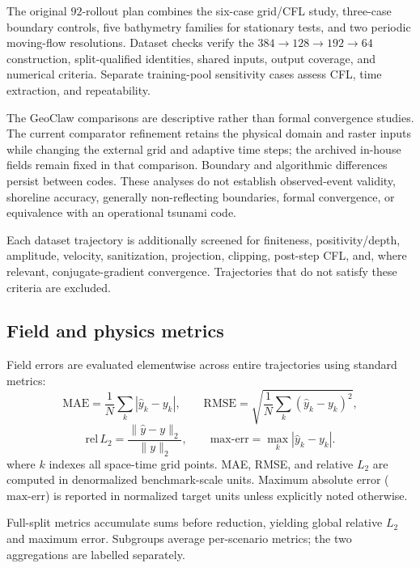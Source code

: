 The original $92$-rollout plan combines the six-case grid/CFL study, three-case boundary controls, five bathymetry families for stationary tests, and two periodic moving-flow resolutions. Dataset checks verify the $384\rightarrow128\rightarrow192\rightarrow64$ construction, split-qualified identities, shared inputs, output coverage, and numerical criteria. Separate training-pool sensitivity cases assess CFL, time extraction, and repeatability.

The GeoClaw comparisons are descriptive rather than formal convergence studies. The current comparator refinement retains the physical domain and raster inputs while changing the external grid and adaptive time steps; the archived in-house fields remain fixed in that comparison. Boundary and algorithmic differences persist between codes. These analyses do not establish observed-event validity, shoreline accuracy, generally non-reflecting boundaries, formal convergence, or equivalence with an operational tsunami code.

Each dataset trajectory is additionally screened for finiteness, positivity/depth, amplitude, velocity, sanitization, projection, clipping, post-step CFL, and, where relevant, conjugate-gradient convergence. Trajectories that do not satisfy these criteria are excluded.

\subsection{Field and physics metrics}
\label{subsec:eval-metrics}
Field errors are evaluated elementwise across entire trajectories using standard metrics:
\begin{equation}
\mathrm{MAE} = \frac{1}{N}\sum_k | \widehat{y}_k - y_k |,
\qquad
\mathrm{RMSE} = \sqrt{\frac{1}{N} \sum_k(\widehat{y}_k - y_k) ^ 2},
\end{equation}
\begin{equation}
\mathrm{rel}\, L_2 = \frac{\|\widehat{y} - y \|_2}{\| y \|_2},
\qquad
\mathrm{max\text{-}err}=\max_k | \widehat{y}_k - y_k |.
\end{equation}
where $k$ indexes all space-time grid points. MAE, RMSE, and relative $L_2$ are computed in denormalized benchmark-scale units. Maximum absolute error ($\mathrm{max\text{-}err}$) is reported in normalized target units unless explicitly noted otherwise.

Full-split metrics accumulate sums before reduction, yielding global relative $L_2$ and maximum error. Subgroups average per-scenario metrics; the two aggregations are labelled separately.

